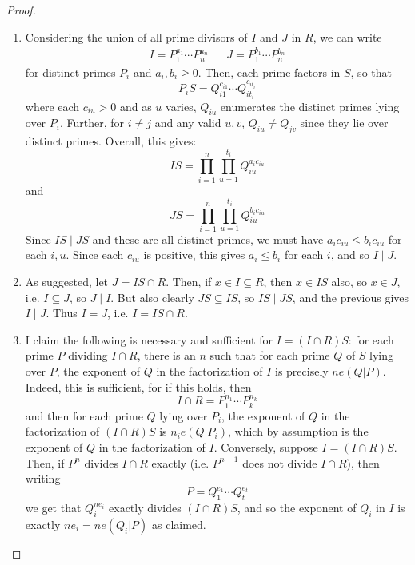 \begin{proof} ${}$
\begin{enumerate}
\item Considering the union of all prime divisors of $I$ and $J$ in $R$, we can write
\begin{align*} I = P_1^{a_1} \cdots P_n^{a_n} && J = P_1^{b_1} \cdots P_n^{b_n} \end{align*}
for distinct primes $P_i$ and $a_i,b_i \geq 0$. Then, each prime factors in $S$, so that
\[ P_iS = Q_{i1}^{c_{i1}} \cdots Q_{it_i}^{c_{it_i}} \]
where each $c_{iu} > 0$ and as $u$ varies, $Q_{iu}$ enumerates the distinct primes lying over $P_i$. Further, for $i \neq j$ and any valid $u,v$, $Q_{iu} \neq Q_{jv}$ since they lie over distinct primes. Overall, this gives:
\[ IS = \prod_{i=1}^n \prod_{u=1}^{t_i} Q_{iu}^{a_ic_{iu}} \]
and
\[ JS = \prod_{i=1}^n \prod_{u=1}^{t_i} Q_{iu}^{b_ic_{iu}} \]
Since $IS \mid JS$ and these are all distinct primes, we must have $a_ic_{iu} \leq b_ic_{iu}$ for each $i,u$. Since each $c_{iu}$ is positive, this gives $a_i \leq b_i$ for each $i$, and so $I \mid J$.

\item As suggested, let $J = IS \cap R$. Then, if $x \in I \subseteq R$, then $x \in IS$ also, so $x \in J$, i.e. $I \subseteq J$, so $J \mid I$. But also clearly $JS \subseteq IS$, so $IS \mid JS$, and the previous gives $I \mid J$. Thus $I=J$, i.e. $I = IS \cap R$.

\item I claim the following is necessary and sufficient for $I = (I \cap R)S$: for each prime $P$ dividing $I \cap R$, there is an $n$ such that for each prime $Q$ of $S$ lying over $P$, the exponent of $Q$ in the factorization of $I$ is precisely $ne(Q|P)$. Indeed, this is sufficient, for if this holds, then
\[ I \cap R = P_1^{n_1} \cdots P_k^{n_k} \]
and then for each prime $Q$ lying over $P_i$, the exponent of $Q$ in the factorization of $(I \cap R)S$ is $n_ie(Q|P_i)$, which by assumption is the exponent of $Q$ in the factorization of $I$. Conversely, suppose $I = (I \cap R)S$. Then, if $P^n$ divides $I \cap R$ exactly (i.e. $P^{n+1}$ does not divide $I \cap R$), then writing
\[ P = Q_1^{e_1} \cdots Q_t^{e_t} \]
we get that $Q_i^{ne_i}$ exactly divides $(I \cap R)S$, and so the exponent of $Q_i$ in $I$ is exactly $ne_i = ne(Q_i|P)$ as claimed.
\end{enumerate}
\end{proof}
